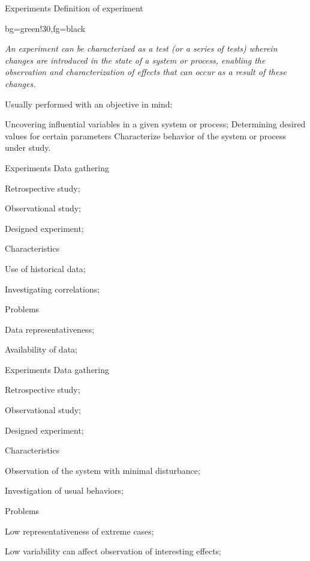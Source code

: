 \documentclass[t]{beamer}
\begin{document}

\begin{ftst}
{Experiments}
{Definition of experiment}
\vone
\begin{colorblock}{}{bg=green!30,fg=black}
\begin{center}
\textit{An experiment can be characterized as a test (or a series of tests) wherein changes are introduced in the state of a system or process, enabling the observation and characterization of effects that can occur as a result of these changes.}
\end{center}
\end{colorblock}
\vone
Usually performed with an objective in mind:

\bitems Uncovering influential variables in a given system or process;
	\spitem Determining desired values for certain parameters
	\spitem Characterize behavior of the system or process under study.
\eitem
\end{ftst}


\begin{ftst}
{Experiments}
{Data gathering}
\begin{block}{}
	{\small\bitems\alert{Retrospective study};
		\item Observational study;
		\item Designed experiment;
	\eitem}
\end{block}
\begin{block}{Characteristics}
	{\small\bitems Use of historical data;
	\item Investigating correlations;\eitem
	}
\end{block}
\begin{block}{Problems}
	{\small\bitems Data representativeness;
	\item Availability of data;\eitem
	}
\end{block}
\end{ftst}


\begin{ftst}
{Experiments}
{Data gathering}
\begin{block}{}
	{\small\bitems Retrospective study;
		\item \alert{Observational study};
		\item Designed experiment;
	\eitem}
\end{block}
\begin{block}{Characteristics}
	{\small\bitems Observation of the system with minimal disturbance;
	\item Investigation of usual behaviors;\eitem
	}
\end{block}
\begin{block}{Problems}
	{\small\bitems Low representativeness of extreme cases;
	\item Low variability can affect observation of interesting effects;\eitem
	}
\end{block}
\end{ftst}
\end{document}
